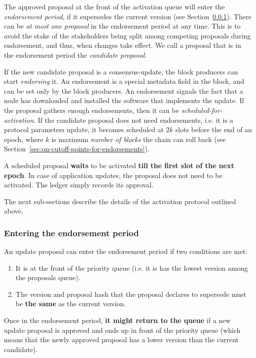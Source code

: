 The approved proposal at the front of the activation queue will enter the
\emph{endorsement period}, if it supersedes the current version (see
Section~\ref{sec:entering-the-endorsement-phase}).
%
There can be \emph{at most one proposal} in the endorsement period at any time.
%
This is to avoid the stake of the stakeholders being split among competing
proposals during endorsement, and thus, when changes take effect.
%
We call a proposal that is in the endorsement period the \emph{candidate
	proposal}.

If the new candidate proposal is a consensus-update, the block producers can
start \emph{endorsing} it. An endorsement is a special metadata field in the
block, and can be set only by the block producers. An endorsement signals the
fact that a node has downloaded and installed the software that implements the
update.
%
If the proposal gathers enough endorsements, then it can be
\emph{scheduled-for-activation}.
%
If the candidate proposal does not need endorsements, i.e. it is a protocol
parameters update, it becomes scheduled at $2k$ slots before the end of an
epoch, where $k$ is maximum \emph{number of blocks} the chain can roll back (see
Section~\ref{sec:on-cutoff-points-for-endorsements}).

A scheduled proposal \textbf{waits} to be activated \textbf{till the first slot
	of the next epoch}. In case of application updates, the proposal does not
	need
to be activated. The ledger simply records its approval.

The next sub-sections describe the details of the activation protocol outlined
above.

\subsubsection{Entering the endorsement period}
\label{sec:entering-the-endorsement-phase}

An update proposal can enter the endorsement period if two conditions are met:
\begin{enumerate}
	\item It is at the front of the priority queue (i.e. it is has the lowest
	version among the proposals queue).
	\item The version and proposal hash that the proposal declares to supersede
	must
	be \textbf{the same} as the current version.
\end{enumerate}
Once in the endorsement period, \textbf{it might return to the queue} if a new
update proposal is approved and ends up in front of the priority queue (which
means that the newly approved proposal has a lower version than the current
candidate).

